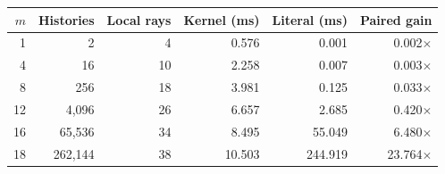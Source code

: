 \begin{tabular}{rrrrrr}
\toprule
$m$ & Histories & Local rays & Kernel (ms) & Literal (ms) & Paired gain\\
\midrule
1 & 2 & 4 & 0.576 & 0.001 & 0.002$\times$\\
4 & 16 & 10 & 2.258 & 0.007 & 0.003$\times$\\
8 & 256 & 18 & 3.981 & 0.125 & 0.033$\times$\\
12 & 4,096 & 26 & 6.657 & 2.685 & 0.420$\times$\\
16 & 65,536 & 34 & 8.495 & 55.049 & 6.480$\times$\\
18 & 262,144 & 38 & 10.503 & 244.919 & 23.764$\times$\\
\bottomrule
\end{tabular}
